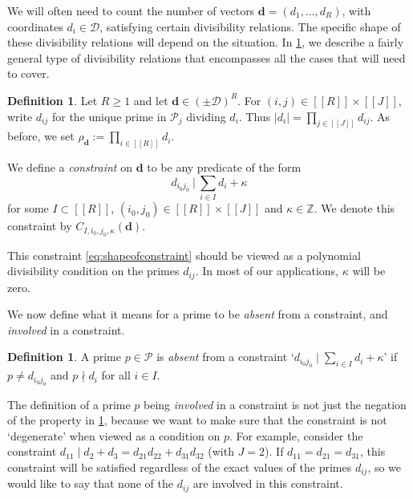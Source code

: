 \documentclass[11pt]{amsart}
\theoremstyle{definition}
\newtheorem{definition}[theorem]{Definition}
\renewcommand{\geq}{\geqslant}
\newcommand{\sinterval}[1]{[\![#1]\!] }
\newcommand{\abs}[1]{\left|#1\right|}
\newcommand{\Z}{\mathbb{Z}}
\newcommand{\primes}{\mathcal{P}}
\newcommand{\D}{\mathcal{D}}
\renewcommand{\d}{\boldsymbol{d}}
\newcommand{\pcomp}[2]{d_{#1#2}}
\newcommand{\fprod}[1]{\rho_{#1}}
\newcommand{\pall}{\fprod{\d}}
\newcommand{\bmid}{\  \Big\vert}
\newcommand{\repR}{J}
\newcommand{\newR}{\sinterval{J}}
\newcommand{\tupsize}{R}
\newcommand{\cshift}{\kappa}
\begin{document}
We will often need to count the number of vectors $\d = (d_1, \ldots, d_\tupsize)$, with coordinates $d_i\in \D$, satisfying certain divisibility relations. The specific shape of these divisibility relations will depend on the situation. In \cref{def:constraints}, we describe a fairly general type of divisibility relations that encompasses all the cases that will need to cover. 
\begin{definition}
\label{def:constraints}
Let $\tupsize \geq 1$ and let $\d \in (\pm \D)^{\tupsize}$. For $(i,j)\in \sinterval{\tupsize} \!\times\! \newR$, write $\pcomp{i}{j}$ for the unique prime in $\primes_j$ dividing $d_i$. Thus $\abs{d_i} = \prod_{j\in \newR} \pcomp{i}{j}$. As before, we set $\pall := \prod_{i\in \sinterval{\tupsize}}d_i$.

We define a \emph{constraint} on $\d$ to be any predicate of the form 
\begin{equation}
\label{eq:shapeofconstraint}
	\pcomp{i_0}{j_0} \bmid\  \sum_{i\in I} d_i + \cshift
\end{equation}
for some $I\subset \sinterval{\tupsize}$, $(i_0, j_0)\in \sinterval{\tupsize}\! \times\! \newR$ and $\cshift\in \Z$. We denote this constraint by $C_{I, i_0,j_0,\cshift}(\d)$.
\end{definition}

This constraint \cref{eq:shapeofconstraint} should be viewed as a polynomial divisibility condition on the primes $\pcomp{i}{j}$. In most of our applications, $\cshift$ will be zero. 

We now define what it means for a prime to be \emph{absent} from a constraint, and \emph{involved} in a constraint.

\begin{definition}
\label{def:absent}
A prime $p\in \primes$ is \emph{absent} from a constraint `$\pcomp{i_0}{j_0} \mid \sum_{i\in I} d_i + \cshift$' if $p\neq \pcomp{i_0}{j_0}$ and $p\nmid d_i$ for all $i\in I$.
\end{definition}

The definition of a prime $p$ being \emph{involved} in a constraint is not just the negation of the property in \cref{def:absent}, because we want to make sure that the constraint is not `degenerate' when viewed as a condition on $p$. For example, consider the constraint ${\pcomp{1}{1} \mid d_2 + d_3 = \pcomp{2}{1}\pcomp{2}{2} + \pcomp{3}{1}\pcomp{3}{2}}$ (with $\repR = 2$). If $\pcomp{1}{1} = \pcomp{2}{1} = \pcomp{3}{1}$, this constraint will be satisfied regardless of the exact values of the primes $\pcomp{i}{j}$, so we would like to say that none of the $\pcomp{i}{j}$ are involved in this constraint.
\end{document}
